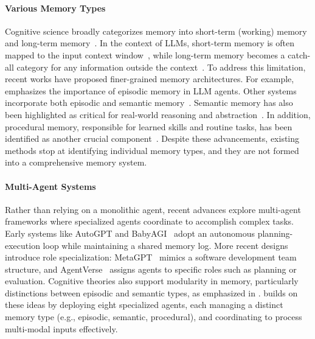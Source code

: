 \paragraph{Various Memory Types}
Cognitive science broadly categorizes memory into short-term (working) memory and long-term memory~\citep{sridhar2023cognitive}. In the context of LLMs, short-term memory is often mapped to the input context window~\citep{li2024memory}, while long-term memory becomes a catch-all category for any information outside the context~\citep{mplus}. To address this limitation, recent works have proposed finer-grained memory architectures. For example, \citet{episodic_memory_missing_piece} emphasizes the importance of episodic memory in LLM agents. Other systems incorporate both episodic and semantic memory~\citep{arigraph,memory_consciousness_and_llm,tulving1985memory}. Semantic memory has also been highlighted as critical for real-world reasoning and abstraction~\citep{procedural_memory_all_you_need,kim2023machine}. In addition, procedural memory, responsible for learned skills and routine tasks, has been identified as another crucial component~\citep{procedural_memory_all_you_need}. Despite these advancements, existing methods stop at identifying individual memory types, and they are not formed into a comprehensive memory system.


\paragraph{Multi-Agent Systems}
Rather than relying on a monolithic agent, recent advances explore multi-agent frameworks where specialized agents coordinate to accomplish complex tasks. Early systems like AutoGPT and BabyAGI~\citep{AutoGPT,BabyAGI} adopt an autonomous planning-execution loop while maintaining a shared memory log. More recent designs introduce role specialization: MetaGPT~\citep{Hong2023} mimics a software development team structure, and AgentVerse~\citep{Chen2024} assigns agents to specific roles such as planning or evaluation. Cognitive theories also support modularity in memory, particularly distinctions between episodic and semantic types, as emphasized in \citet{Liao2024}. \ours builds on these ideas by deploying eight specialized agents, each managing a distinct memory type (e.g., episodic, semantic, procedural), and coordinating to process multi-modal inputs effectively.
